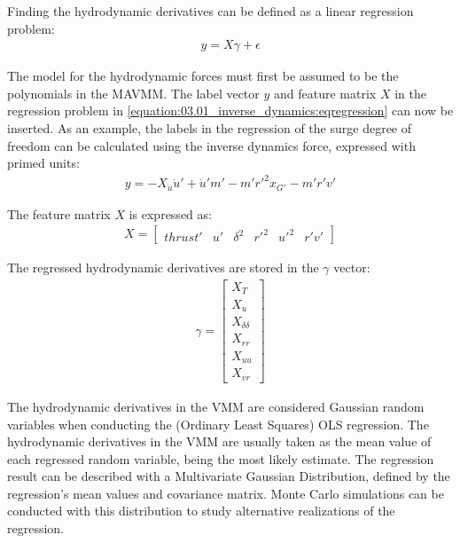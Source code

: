 \documentclass[review]{elsarticle}
\begin{document}
  
Finding the hydrodynamic derivatives can be defined as a linear regression problem:
\begin{equation}\label{equation:03.01_inverse_dynamics:eqregression}
\begin{split}y = X\gamma + \epsilon\end{split}
\end{equation}
  
The model for the hydrodynamic forces must first be assumed to be the polynomials in the MAVMM.
The label vector \(y\) and feature matrix \(X\) in the regression problem in \autoref{equation:03.01_inverse_dynamics:eqregression} can now be inserted. As an example, the labels in the regression of the surge degree of freedom can be calculated using the inverse dynamics force, expressed with primed units:
\begin{equation}\label{equation:03.01_inverse_dynamics:diff_eq_X_y}
\begin{split}\displaystyle y = - X_{\dot{u}} \dot{u}' + \dot{u}' m' - m' r'^{2} x_{G'} - m' r' v'\end{split}
\end{equation}
  
The feature matrix \(X\) is expressed as:
\begin{equation}\label{equation:03.01_inverse_dynamics:diff_eq_X_X}
\begin{split}\displaystyle X = \left[\begin{matrix}thrust' & u' & \delta^{2} & r'^{2} & u'^{2} & r' v'\end{matrix}\right]\end{split}
\end{equation}
  
The regressed hydrodynamic derivatives are stored in the \(\gamma\) vector:
\begin{equation}\label{equation:03.01_inverse_dynamics:diff_eq_X_beta}
\begin{split}\displaystyle \gamma = \left[\begin{matrix}X_{T}\\X_{u}\\X_{\delta\delta}\\X_{rr}\\X_{uu}\\X_{vr}\end{matrix}\right]\end{split}
\end{equation}
  
The hydrodynamic derivatives in the VMM are considered Gaussian random variables when conducting the (Ordinary Least Squares) OLS regression. The hydrodynamic derivatives in the VMM are usually taken as the mean value of each regressed random variable, being the most likely estimate. The regression result can be described with a Multivariate Gaussian Distribution, defined by the regression's mean values and covariance matrix. Monte Carlo simulations can be conducted with this distribution to study alternative realizations of the regression.
\end{document}
